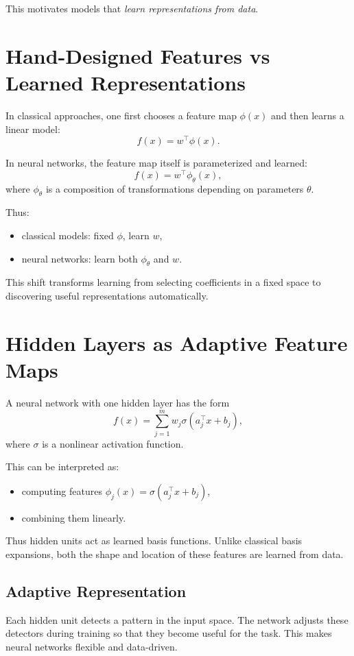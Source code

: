 This motivates models that \emph{learn representations from data}.

\section{Hand-Designed Features vs Learned Representations}

In classical approaches, one first chooses a feature map $\phi(x)$ and then learns a linear model:
\[
f(x)=w^\top \phi(x).
\]

In neural networks, the feature map itself is parameterized and learned:
\[
f(x)=w^\top \phi_\theta(x),
\]
where $\phi_\theta$ is a composition of transformations depending on parameters $\theta$.

Thus:
\begin{itemize}
    \item classical models: fixed $\phi$, learn $w$,
    \item neural networks: learn both $\phi_\theta$ and $w$.
\end{itemize}

This shift transforms learning from selecting coefficients in a fixed space to discovering useful representations automatically.

\section{Hidden Layers as Adaptive Feature Maps}

A neural network with one hidden layer has the form
\[
f(x)=\sum_{j=1}^m w_j \sigma(a_j^\top x + b_j),
\]
where $\sigma$ is a nonlinear activation function.

This can be interpreted as:
\begin{itemize}
    \item computing features $\phi_j(x)=\sigma(a_j^\top x + b_j)$,
    \item combining them linearly.
\end{itemize}

Thus hidden units act as learned basis functions. Unlike classical basis expansions, both the shape and location of these features are learned from data.

\subsection{Adaptive Representation}

Each hidden unit detects a pattern in the input space. The network adjusts these detectors during training so that they become useful for the task. This makes neural networks flexible and data-driven.

